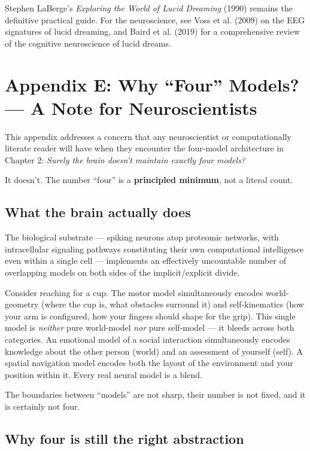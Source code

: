 \documentclass[11pt, twoside, openright]{book}
\begin{document}
Stephen LaBerge's \textit{Exploring the World of Lucid Dreaming} (1990) remains the definitive practical guide. For the neuroscience, see Voss et al. (2009) on the EEG signatures of lucid dreaming, and Baird et al. (2019) for a comprehensive review of the cognitive neuroscience of lucid dreams.


\chapter*{Appendix E: Why ``Four'' Models? --- A Note for Neuroscientists}

This appendix addresses a concern that any neuroscientist or computationally literate reader will have when they encounter the four-model architecture in Chapter 2: \textit{Surely the brain doesn't maintain exactly four models?}

It doesn't. The number ``four'' is a \textbf{principled minimum}, not a literal count.

\section*{What the brain actually does}

The biological substrate --- spiking neurons atop proteomic networks, with intracellular signaling pathways constituting their own computational intelligence even within a single cell --- implements an effectively uncountable number of overlapping models on both sides of the implicit/\allowbreak{}explicit divide.

Consider reaching for a cup. The motor model simultaneously encodes world-geometry (where the cup is, what obstacles surround it) and self-kinematics (how your arm is configured, how your fingers should shape for the grip). This single model is \textit{neither} pure world-model \textit{nor} pure self-model --- it bleeds across both categories. An emotional model of a social interaction simultaneously encodes knowledge about the other person (world) and an assessment of yourself (self). A spatial navigation model encodes both the layout of the environment and your position within it. Every real neural model is a blend.

The boundaries between ``models'' are not sharp, their number is not fixed, and it is certainly not four.

\section*{Why four is still the right abstraction}
\end{document}
